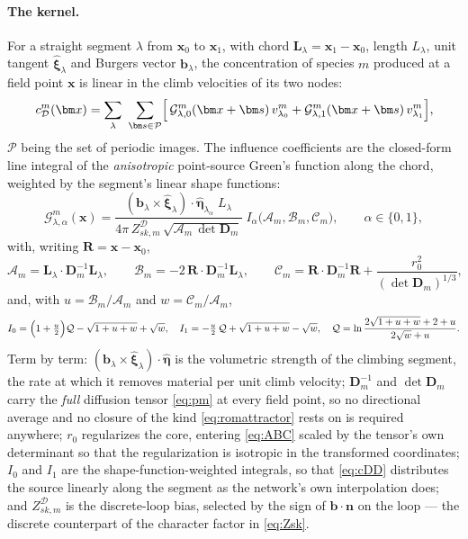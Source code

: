 \documentclass{article}
\newcommand{\bvec}{\bm b}
\newcommand{\nvec}{\bm n}
\newcommand{\Dten}{\bm D}
\begin{document}
\paragraph{The kernel.} For a straight segment $\lambda$ from $\bm x_0$ to
$\bm x_1$, with chord $\bm L_\lambda=\bm x_1-\bm x_0$, length $L_\lambda$, unit
tangent $\hat{\bm\xi}_\lambda$ and Burgers vector $\bvec_\lambda$, the
concentration of species $m$ produced at a field point $\bm x$ is linear in the
climb velocities of its two nodes:
\begin{equation}
  c^m_{\mathcal D}(\bm x)=\sum_{\lambda}\ \sum_{\bm s\in\mathcal P}
    \Bigl[\,\mathcal G^{m}_{\lambda,0}(\bm x+\bm s)\,v^m_{\lambda_0}
          +\mathcal G^{m}_{\lambda,1}(\bm x+\bm s)\,v^m_{\lambda_1}\Bigr],
  \label{eq:cDD}
\end{equation}
$\mathcal P$ being the set of periodic images. The influence coefficients are the
closed-form line integral of the \emph{anisotropic} point-source Green's function
along the chord, weighted by the segment's linear shape functions:
\begin{equation}
  \mathcal G^{m}_{\lambda,\alpha}(\bm x)
   =\frac{(\bvec_\lambda\times\hat{\bm\xi}_\lambda)\cdot
          \hat{\bm\eta}_{\lambda_\alpha}\;L_\lambda}
         {4\pi\,Z^{\mathcal D}_{sk,m}\,\sqrt{\mathcal A_m\,\det\Dten_m}}\;
    I_\alpha\bigl(\mathcal A_m,\mathcal B_m,\mathcal C_m\bigr),
  \qquad \alpha\in\{0,1\},
  \label{eq:Gkernel}
\end{equation}
with, writing $\bm R=\bm x-\bm x_0$,
\begin{equation}
  \mathcal A_m=\bm L_\lambda\!\cdot\!\Dten_m^{-1}\bm L_\lambda,
  \qquad
  \mathcal B_m=-2\,\bm R\!\cdot\!\Dten_m^{-1}\bm L_\lambda,
  \qquad
  \mathcal C_m=\bm R\!\cdot\!\Dten_m^{-1}\bm R
              +\frac{r_0^{2}}{(\det\Dten_m)^{1/3}},
  \label{eq:ABC}
\end{equation}
and, with $u=\mathcal B_m/\mathcal A_m$ and $w=\mathcal C_m/\mathcal A_m$,
\begin{equation}
  I_0=\Bigl(1+\tfrac{u}{2}\Bigr)\mathcal Q-\sqrt{1+u+w}+\sqrt{w},
  \quad
  I_1=-\tfrac{u}{2}\,\mathcal Q+\sqrt{1+u+w}-\sqrt{w},
  \quad
  \mathcal Q=\ln\frac{2\sqrt{1+u+w}+2+u}{2\sqrt{w}+u}.
  \label{eq:I01}
\end{equation}
Term by term:
$(\bvec_\lambda\times\hat{\bm\xi}_\lambda)\cdot\hat{\bm\eta}$ is the volumetric
strength of the climbing segment, the rate at which it removes material per unit
climb velocity; $\Dten_m^{-1}$ and $\det\Dten_m$ carry the \emph{full} diffusion
tensor \cref{eq:pm} at every field point, so no directional average and no
closure of the kind \cref{eq:romattractor} rests on is required anywhere; $r_0$
regularizes the core, entering \cref{eq:ABC} scaled by the tensor's own
determinant so that the regularization is isotropic in the transformed
coordinates; $I_0$ and $I_1$ are the shape-function-weighted integrals, so that
\cref{eq:cDD} distributes the source linearly along the segment as the network's
own interpolation does; and $Z^{\mathcal D}_{sk,m}$ is the discrete-loop bias,
selected by the sign of $\bvec\!\cdot\!\nvec$ on the loop --- the discrete
counterpart of the character factor in \cref{eq:Zsk}.
\end{document}
